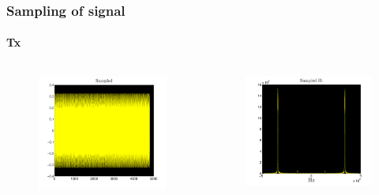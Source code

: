 \documentclass[11pt]{beamer} %
\begin{document}
\begin{frame}
 \frametitle{Sampling of signal}
\framesubtitle{Tx}
 \begin{columns}[T]
        \begin{column}{.5\textwidth}
           
       \begin{figure}
\includegraphics[width=1\textwidth]{Figures/SampledTx.pdf}
\end{figure}
        \end{column}
         \begin{column}{.5\textwidth}

     \begin{figure}
\includegraphics[width=1\textwidth]{Figures/SampledTxFft.pdf}
\end{figure}
        \end{column}
\end{columns}
\end{frame}
\end{document}
